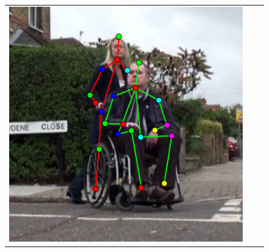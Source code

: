 \begin{figure}
\begin{tabular}{c c c }
  \includegraphics[width=0.31\linewidth]{imgidx_0672_sticks.pdf} 
  \\




\end{tabular}
\end{figure}
